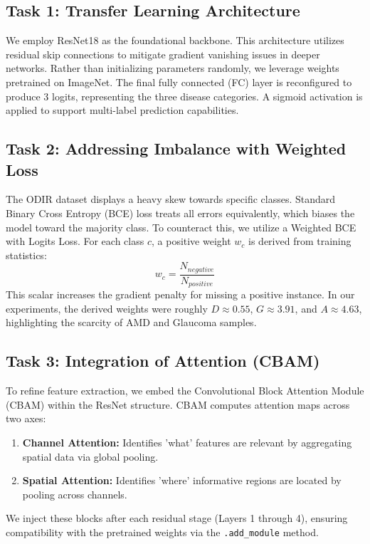 \documentclass[10pt, letterpaper, twocolumn]{article}
\begin{document}
\subsection{Task 1: Transfer Learning Architecture}
We employ ResNet18 as the foundational backbone. This architecture utilizes residual skip connections to mitigate gradient vanishing issues in deeper networks. Rather than initializing parameters randomly, we leverage weights pretrained on ImageNet. The final fully connected (FC) layer is reconfigured to produce 3 logits, representing the three disease categories. A sigmoid activation is applied to support multi-label prediction capabilities.

\subsection{Task 2: Addressing Imbalance with Weighted Loss}
The ODIR dataset displays a heavy skew towards specific classes. Standard Binary Cross Entropy (BCE) loss treats all errors equivalently, which biases the model toward the majority class. To counteract this, we utilize a Weighted BCE with Logits Loss. For each class $c$, a positive weight $w_c$ is derived from training statistics:
\begin{equation}
    w_c = \frac{N_{negative}}{N_{positive}}
\end{equation}
This scalar increases the gradient penalty for missing a positive instance. In our experiments, the derived weights were roughly $D \approx 0.55$, $G \approx 3.91$, and $A \approx 4.63$, highlighting the scarcity of AMD and Glaucoma samples.

\subsection{Task 3: Integration of Attention (CBAM)}
To refine feature extraction, we embed the Convolutional Block Attention Module (CBAM) within the ResNet structure. CBAM computes attention maps across two axes:
\begin{enumerate}
    \item \textbf{Channel Attention:} Identifies 'what' features are relevant by aggregating spatial data via global pooling.
    \item \textbf{Spatial Attention:} Identifies 'where' informative regions are located by pooling across channels.
\end{enumerate}
We inject these blocks after each residual stage (Layers 1 through 4), ensuring compatibility with the pretrained weights via the \texttt{.add\_module} method.
\end{document}
